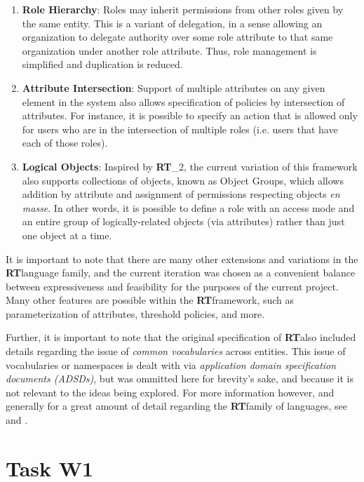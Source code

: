 \documentclass{article}
\providecommand{\RT}{\textbf{RT}}
\begin{document}
\begin{itemize}
\begin{enumerate}
    \item \textbf{Role Hierarchy}: Roles may inherit permissions from other roles given by the same entity. This is a variant of delegation, in a sense allowing an organization to delegate authority over some role attribute to that same organization under another role attribute. Thus, role management is simplified and duplication is reduced.
    \item \textbf{Attribute Intersection}: Support of multiple attributes on any given element in the system also allows specification of policies by intersection of attributes. For instance, it is possible to specify an action that is allowed only for users who are in the intersection of multiple roles (i.e. users that have each of those roles).
    \item \textbf{Logical Objects}: Inspired by \RT_2, the current variation of this framework also supports collections of objects, known as Object Groups, which allows addition by attribute and assignment of permissions respecting objects \textit{en masse}. In other words, it is possible to define a role with an access mode and an entire group of logically-related objects (via attributes) rather than just one object at a time.
  \end{enumerate}
\end{itemize}
It is important to note that there are many other extensions and variations in the \RT language family, and the current iteration was chosen as a convenient balance between expressiveness and feasibility for the purposes of the current project. Many other features are possible within the \RT framework, such as parameterization of attributes, threshold policies, and more. \par
Further, it is important to note that the original specification of \RT also included details regarding the issue of \textit{common vocabularies} across entities. This issue of vocabularies or namespaces is dealt with via \textit{application domain specification documents (ADSDs)}, but was ommitted here for brevity's sake, and because it is not relevant to the ideas being explored. For more information however, and generally for a great amount of detail regarding the \RT family of languages, see \cite{RTmain} and \cite{RTold}.


\section{Task W1}
\end{document}

